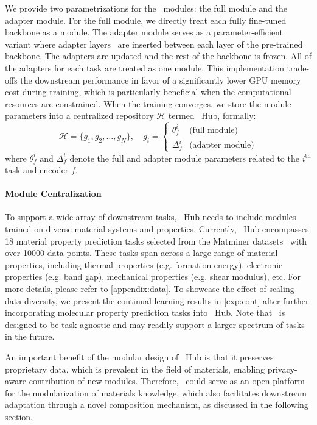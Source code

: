 We provide two parametrizations for the \name \ modules: the full module and the adapter module.
For the full module, we directly treat each fully fine-tuned backbone as a module.
The adapter module serves as a parameter-efficient variant where adapter layers~\cite{houlsby2019parameter} are inserted between each layer of the pre-trained backbone. The adapters are updated and the rest of the backbone is frozen. All of the adapters for each task are treated as one module. This implementation trade-offs the downstream performance in favor of a significantly lower GPU memory cost during training, which is particularly beneficial when the computational resources are constrained. When the training converges, we store the module parameters into a centralized repository $\mathcal{H}$ termed \name \ Hub, formally:
\begin{equation*}
\mathcal{H} = \{g_1, g_2, \dots, g_{N}\}, \quad g_i = \begin{cases}
\theta_f^{i} & \text{(full module)} \\
\Delta_f^{i} & \text{(adapter module)}
\end{cases}
\label{eq:hub}
\end{equation*}
where $\theta_f^{i}$ and $\Delta_f^{i}$ denote the full and adapter module parameters related to the $i^{\text{th}}$ task and encoder $f$.

\paragraph{Module Centralization}
To support a wide array of downstream tasks, \name \ Hub needs to include modules trained on diverse material systems and properties. Currently, \name \ Hub encompasses 18 material property prediction tasks selected from the Matminer datasets~\citep{ward2018matminer} with over 10000 data points. These tasks span across a large range of material properties, including thermal properties (e.g. formation energy), electronic properties (e.g. band gap), mechanical properties (e.g. shear modulus), etc. For more details, please refer to \cref{appendix:data}.
To showcase the effect of scaling data diversity, we present the continual learning results in \cref{exp:cont} after further incorporating molecular property prediction tasks into \name \ Hub. Note that \name \ is designed to be task-agnostic and may readily support a larger spectrum of tasks in the future. 

An important benefit of the modular design of \name \ Hub is that it preserves proprietary data, which is prevalent in the field of materials, enabling privacy-aware contribution of new modules. Therefore, \name \ could serve as an open platform for the modularization of materials knowledge, which also facilitates downstream adaptation through a novel composition mechanism, as discussed in the following section.


